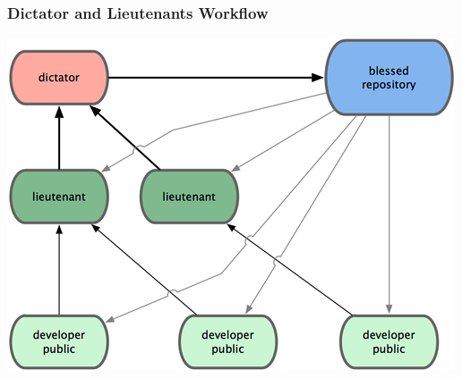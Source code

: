 \documentclass[english,compress]{beamer}
\begin{document}
\frame
{
    \frametitle{Dictator and Lieutenants Workflow}

    \begin{center}
        \includegraphics[width=.7\textwidth]{figs/dictator-lieutenant-workflow.png}\cite{book}
    \end{center}

}
\end{document}
